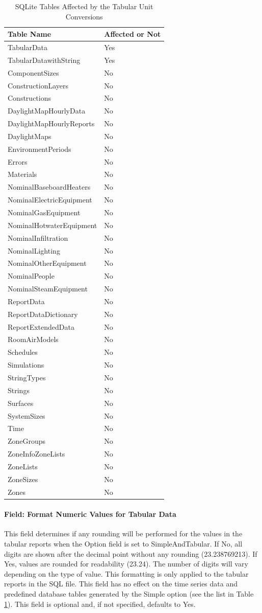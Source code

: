 {\scriptsize
\begin{longtable}[c]{p{4in}p{1in}}
\caption{SQLite Tables Affected by the Tabular Unit Conversions\label{table:tabular_unit_conversion_list}} \tabularnewline
\toprule
Table Name & Affected or Not \tabularnewline
\midrule
\endfirsthead

TabularData & Yes \tabularnewline
TabularDatawithString & Yes \tabularnewline
ComponentSizes & No \tabularnewline
ConstructionLayers & No \tabularnewline
Constructions & No \tabularnewline
DaylightMapHourlyData & No \tabularnewline
DaylightMapHourlyReports & No \tabularnewline
DaylightMaps & No \tabularnewline
EnvironmentPeriods & No \tabularnewline
Errors & No \tabularnewline
Materials & No \tabularnewline
NominalBaseboardHeaters & No \tabularnewline
NominalElectricEquipment & No \tabularnewline
NominalGasEquipment & No \tabularnewline
NominalHotwaterEquipment & No \tabularnewline
NominalInfiltration & No \tabularnewline
NominalLighting & No \tabularnewline
NominalOtherEquipment & No\tabularnewline
NominalPeople & No \tabularnewline
NominalSteamEquipment & No \tabularnewline
ReportData & No \tabularnewline
ReportDataDictionary & No \tabularnewline
ReportExtendedData & No \tabularnewline
RoomAirModels & No \tabularnewline
Schedules & No \tabularnewline
Simulations & No \tabularnewline
StringTypes & No \tabularnewline
Strings & No \tabularnewline
Surfaces & No \tabularnewline
SystemSizes & No \tabularnewline
Time & No \tabularnewline
ZoneGroups & No \tabularnewline
ZoneInfoZoneLists & No \tabularnewline
ZoneLists & No \tabularnewline
ZoneSizes & No \tabularnewline
Zones & No \tabularnewline

\bottomrule
\end{longtable}
}

\paragraph{Field: Format Numeric Values for Tabular Data}\label{field-format-numeric-values-for-tabular-data}

This field determines if any rounding will be performed for the values in the tabular reports when the Option field is set to SimpleAndTabular. If No, all digits are shown after the decimal point without any rounding (23.238769213). If Yes, values are rounded for readability (23.24). The number of digits will vary depending on the type of value. This formatting is only applied to the tabular reports in the SQL file. This field has no effect on the time series data and predefined database tables generated by the Simple option (see the list in Table \ref{table:tabular_unit_conversion_list}). This field is optional and, if not specified, defaults to Yes.

